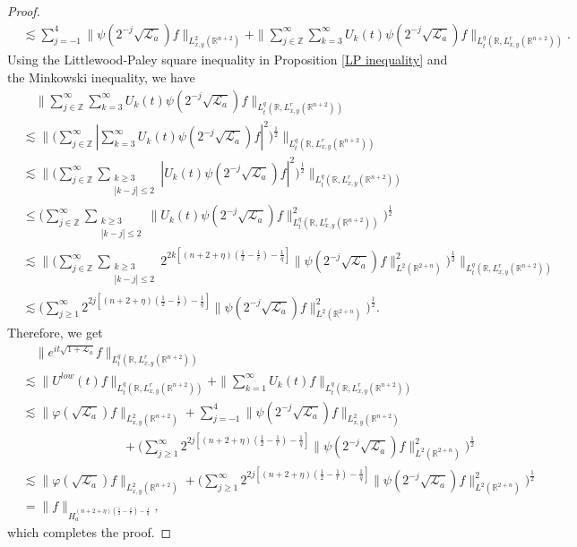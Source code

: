 \documentclass[a4paper,11pt, reqno]{amsart}
\numberwithin{equation}{section}
\theoremstyle{plain}
\theoremstyle{definition}
\theoremstyle{remark}
\begin{document}
\begin{proof}
\begin{align*}
&\lesssim \sum_{j=-1}^4\|\psi(2^{-j}\sqrt{\mathcal{L}_a})f\|_{L^2_{x,y}(\mathbb{R}^{n+2})}+\|\sum_{j\in\mathbb{Z}}^\infty\sum_{k=3}^\infty U_k(t)\psi(2^{-j}\sqrt{\mathcal{L}_a})f\|_{L_t^q(\mathbb{R},L^r_{x,y}(\mathbb{R}^{n+2}))}.
\end{align*}
Using the Littlewood-Paley square inequality in Proposition \ref{LP inequality} and the Minkowski inequality, we have
\begin{align*}
&\quad\|\sum_{j\in\mathbb{Z}}^\infty\sum_{k=3}^\infty U_k(t)\psi(2^{-j}\sqrt{\mathcal{L}_a})f\|_{L_t^q(\mathbb{R},L^r_{x,y}(\mathbb{R}^{n+2}))}\\
&\lesssim \|\Big(\sum_{j\in\mathbb{Z}}^\infty |\sum_{k=3}^\infty U_k(t)\psi(2^{-j}\sqrt{\mathcal{L}_a})f|^2\Big)^\frac{1}{2}\|_{L_t^q(\mathbb{R},L^r_{x,y}(\mathbb{R}^{n+2}))}\\
&\lesssim \|\Big(\sum_{j\in\mathbb{Z}}^\infty \sum_{\substack{k\geq 3\\ |k-j|\leq 2}} |U_k(t)\psi(2^{-j}\sqrt{\mathcal{L}_a})f|^2\Big)^\frac{1}{2}\|_{L_t^q(\mathbb{R},L^r_{x,y}(\mathbb{R}^{n+2}))}\\
&\leq \Big(\sum_{j\in\mathbb{Z}}^\infty \sum_{\substack{k\geq 3\\ |k-j|\leq 2}} \|U_k(t)\psi(2^{-j}\sqrt{\mathcal{L}_a})f\|_{L_t^q(\mathbb{R},L^r_{x,y}(\mathbb{R}^{n+2}))}^2\Big)^\frac{1}{2}\\
&\lesssim \|\Big(\sum_{j\in\mathbb{Z}}^\infty \sum_{\substack{k\geq 3\\ |k-j|\leq 2}} 2^{2k[(n+2+\eta)(\frac{1}{2}-\frac{1}{r})-\frac{1}{q}]}\|\psi(2^{-j}\sqrt{\mathcal{L}_a})f\|^2_{L^2(\mathbb{R}^{2+n})}\Big)^\frac{1}{2}\|_{L_t^q(\mathbb{R},L^r_{x,y}(\mathbb{R}^{n+2}))}\\
&\lesssim \Big(\sum_{j\geq1}^\infty 2^{2j[(n+2+\eta)(\frac{1}{2}-\frac{1}{r})-\frac{1}{q}]}\|\psi(2^{-j}\sqrt{\mathcal{L}_a})f\|^2_{L^2(\mathbb{R}^{2+n})}\Big)^\frac{1}{2}.
\end{align*}
Therefore, we get
\begin{align*}
&\quad \|e^{it\sqrt{1+\mathcal{L}_a}}f\|_{L_t^q(\mathbb{R},L^r_{x,y}(\mathbb{R}^{n+2}))}\\
&\lesssim \|U^{low}(t)f\|_{L_t^q(\mathbb{R},L^r_{x,y}(\mathbb{R}^{n+2}))}+\|\sum_{k=1}^\infty U_k(t)f\|_{L_t^q(\mathbb{R},L^r_{x,y}(\mathbb{R}^{n+2}))}\\
&\lesssim\|\varphi(\sqrt{\mathcal{L}_a})f\|_{L^2_{x,y}(\mathbb{R}^{n+2})}+\sum_{j=-1}^4\|\psi(2^{-j}\sqrt{\mathcal{L}_a})f\|_{L^2_{x,y}(\mathbb{R}^{n+2})}\\
&\qquad\qquad\qquad\qquad+\Big(\sum_{j\geq1}^\infty 2^{2j[(n+2+\eta)(\frac{1}{2}-\frac{1}{r})-\frac{1}{q}]}\|\psi(2^{-j}\sqrt{\mathcal{L}_a})f\|^2_{L^2(\mathbb{R}^{2+n})}\Big)^\frac{1}{2}\\
&\lesssim\|\varphi(\sqrt{\mathcal{L}_a})f\|_{L^2_{x,y}(\mathbb{R}^{n+2})}+\Big(\sum_{j\geq1}^\infty 2^{2j[(n+2+\eta)(\frac{1}{2}-\frac{1}{r})-\frac{1}{q}]}\|\psi(2^{-j}\sqrt{\mathcal{L}_a})f\|^2_{L^2(\mathbb{R}^{2+n})}\Big)^\frac{1}{2}\\
&=\|f\|_{H_a^{(n+2+\eta)(\frac{1}{2}-\frac{1}{r})-\frac{1}{q}}},
\end{align*}
which completes the proof.
\end{proof}
\end{document}
